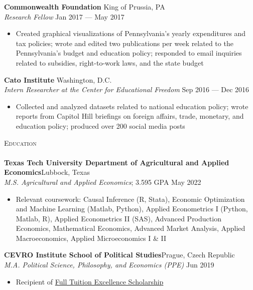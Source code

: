 \documentclass[a4paper,11pt]{article}
\newcommand{\lineunder} {
    \vspace*{-8pt} \\
    \hspace*{-18pt} \hrulefill \\
}
\newcommand{\header} [1] {
    {\hspace*{-18pt}\vspace*{6pt} \textsc{\large{#1}}}
    \vspace*{-6pt} \lineunder
}
\begin{document}
\textbf{Commonwealth Foundation} \hfill \faMapMarker\space King of Prussia, PA\\
\textit{Research Fellow} \hfill Jan 2017 --- May 2017\\
\begin{itemize}
    \item Created graphical visualizations of Pennsylvania's yearly expenditures and tax policies; wrote and edited two publications per week related to the Pennsylvania's budget and education policy; responded to email inquiries related to subsidies, right-to-work laws, and the state budget
\end{itemize}

\textbf{Cato Institute} \hfill \faMapMarker\space Washington, D.C.\\
\textit{Intern Researcher at the Center for Educational Freedom} \hfill Sep 2016 --- Dec 2016\\
\begin{itemize}
    \item Collected and analyzed datasets related to national education policy; wrote reports from Capitol Hill briefings on foreign affairs, trade, monetary, and education policy; produced over 200 social media posts 
\end{itemize}
\vspace{1mm}

\header{Education}
\textbf{Texas Tech University Department of Agricultural and Applied Economics}\hfill \faMapMarker\space Lubbock, Texas\\
\textit{M.S. Agricultural and Applied Economics}; 3.595 GPA \hfill May 2022 \\
\begin{itemize}
    \item Relevant coursework: Causal Inference (R, Stata), Economic Optimization and Machine Learning (Matlab, Python), Applied Econometrics I (Python, Matlab, R), Applied Econometrics II (SAS), Advanced Production Economics, Mathematical Economics, Advanced Market Analysis, Applied Macroeconomics, Applied Microeconomics I \& II
\end{itemize}

\textbf{CEVRO Institute School of Political Studies}\hfill \faMapMarker\space Prague, Czech Republic\\
\textit{M.A. Political Science, Philosophy, and Economics (PPE)} \hfill Jun 2019\\
\begin{itemize}
    \item Recipient of \href{http://www.cevroinstitut.cz/en/article/scholarships/}{Full Tuition Excellence Scholarship}
\end{itemize}
\end{document}
